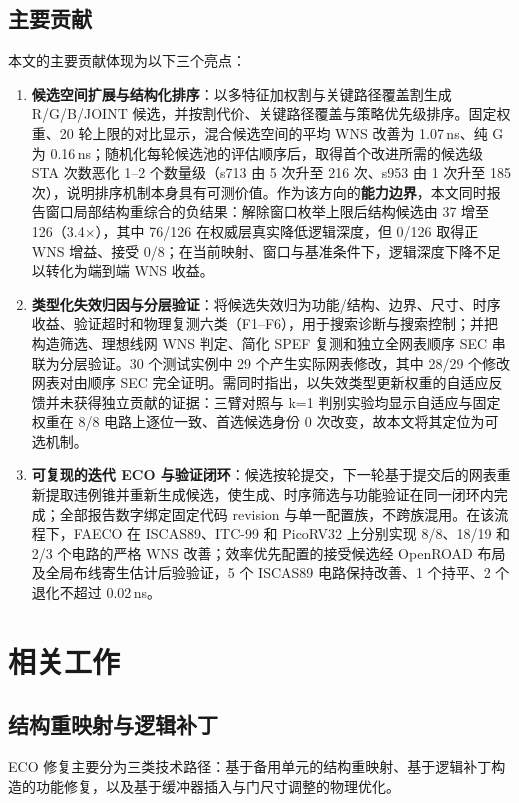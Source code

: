 \documentclass[twocolumn,10pt,fontset=windows]{ctexart}
\begin{document}
\subsection{主要贡献}
本文的主要贡献体现为以下三个亮点：

\begin{enumerate}
  \item \textbf{候选空间扩展与结构化排序}：以多特征加权割与关键路径覆盖割生成 R/G/B/JOINT 候选，并按割代价、关键路径覆盖与策略优先级排序。固定权重、20 轮上限的对比显示，混合候选空间的平均 WNS 改善为 1.07\,ns、纯 G 为 0.16\,ns；随机化每轮候选池的评估顺序后，取得首个改进所需的候选级 STA 次数恶化 1--2 个数量级（s713 由 5 次升至 216 次、s953 由 1 次升至 185 次），说明排序机制本身具有可测价值。作为该方向的\textbf{能力边界}，本文同时报告窗口局部结构重综合的负结果：解除窗口枚举上限后结构候选由 37 增至 126（3.4$\times$），其中 76/126 在权威层真实降低逻辑深度，但 0/126 取得正 WNS 增益、接受 0/8；在当前映射、窗口与基准条件下，逻辑深度下降不足以转化为端到端 WNS 收益。
  \item \textbf{类型化失效归因与分层验证}：将候选失效归为功能/结构、边界、尺寸、时序收益、验证超时和物理复测六类（F1--F6），用于搜索诊断与搜索控制；并把构造筛选、理想线网 WNS 判定、简化 SPEF 复测和独立全网表顺序 SEC 串联为分层验证。30 个测试实例中 29 个产生实际网表修改，其中 28/29 个修改网表对由顺序 SEC 完全证明。需同时指出，以失效类型更新权重的自适应反馈并未获得独立贡献的证据：三臂对照与 k=1 判别实验均显示自适应与固定权重在 8/8 电路上逐位一致、首选候选身份 0 次改变，故本文将其定位为可选机制。
  \item \textbf{可复现的迭代 ECO 与验证闭环}：候选按轮提交，下一轮基于提交后的网表重新提取违例锥并重新生成候选，使生成、时序筛选与功能验证在同一闭环内完成；全部报告数字绑定固定代码 revision 与单一配置族，不跨族混用。在该流程下，FAECO 在 ISCAS89、ITC-99 和 PicoRV32 上分别实现 8/8、18/19 和 2/3 个电路的严格 WNS 改善；效率优先配置的接受候选经 OpenROAD 布局及全局布线寄生估计后验验证，5 个 ISCAS89 电路保持改善、1 个持平、2 个退化不超过 0.02\,ns。
\end{enumerate}

\section{相关工作}

\subsection{结构重映射与逻辑补丁}
ECO 修复主要分为三类技术路径：基于备用单元的结构重映射、基于逻辑补丁构造的功能修复，以及基于缓冲器插入与门尺寸调整的物理优化。
\end{document}
